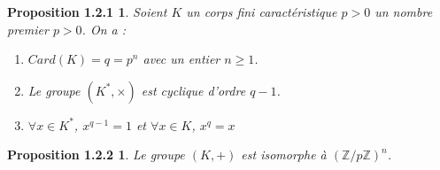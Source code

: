 \newtheorem*{prop1}{Proposition 1.2.1}
\begin{prop1}
	Soient $K$ un corps fini caractéristique $p>0$ un nombre premier $p>0$. On a :
	\begin{enumerate}
		\item $Card(K)=q=p^{n}$ avec un entier $n\geq1$.
		\item Le groupe $(K^{*},\times)$ est cyclique d'ordre $q-1$.
		\item $\forall x\in K^{*}$, $x^{q-1}=1$ et $\forall x\in K$, $x^{q}=x$
	\end{enumerate}
\end{prop1}

\newtheorem*{prop2}{Proposition 1.2.2}
\begin{prop2}
	Le groupe $(K,+)$ est isomorphe à $(\mathbb{Z}/p\mathbb{Z})^{n}$.
\end{prop2}
